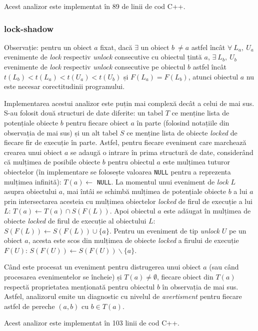 Acest analizor este implementat în 89 de linii de cod C++.

\subsubsection{lock-shadow}

Observație: pentru un obiect $a$ fixat, dacă $\exists$ un
obiect $b\ \neq a$ astfel încât $\forall\ L_a,\ U_a$ evenimente de
\textit{lock} respectiv \textit{unlock} consecutive cu obiectul țintă
$a$, $\exists\ L_b,\ U_b$ evenimente de \textit{lock} respectiv
\textit{unlock} consecutive pe obiectul $b$ astfel încât 
$t(L_b) < t(L_a) < t(U_a) < t(U_b)$ și $F(L_a) = F(L_b)$, atunci
obiectul $a$ nu este necesar corectitudinii programului.

Implementarea acestui analizor este puțin mai complexă decât a celui de
mai sus. S-au folosit două structuri de date diferite: un tabel $T$ ce 
menține lista de potențiale obiecte $b$ pentru fiecare obiect $a$ în
parte (folosind notațiile din observația de mai sus) și un alt tabel $S$
ce menține lista de obiecte \textit{locked} de fiecare fir de execuție
în parte. Astfel, pentru fiecare eveniment care marchează crearea unui
obiect $a$ se adaugă o intrare în prima structură de date, considerând
că mulțimea de posibile obiecte $b$ pentru obiectul $a$ este mulțimea
tuturor obiectelor (în implementare se folosește valoarea
\lstinline{NULL} pentru a reprezenta mulțimea infinită):
$T(a) \gets $ \lstinline{NULL}. La momentul unui eveniment de
\textit{lock} $L$ asupra obiectului $a$, mai întâi se schimbă mulțimea
de potențiale obiecte $b$ a lui $a$  prin intersectarea acesteia cu
mulțimea obiectelor \textit{locked} de firul de execuție a lui $L$:
$T(a) \gets T(a) \cap S(F(L))$. Apoi obiectul $a$ este adăugat în
mulțimea de obiecte \textit{locked} de firul de execuție al obiectului
$L$: $S(F(L)) \gets S(F(L)) \cup \{a\}$. Pentru un eveniment de tip
\textit{unlock} $U$ pe un obiect $a$, acesta este scos din mulțimea de
obiecte \textit{locked} a firului de execuție $F(U)$:
$S(F(U)) \gets S(F(U)) \backslash \{a\}$.

Când este procesat un eveniment pentru distrugerea unui obiect $a$ (sau
când procesarea evenimentelor se încheie) și $T(a) \neq \emptyset$,
fiecare obiect din $T(a)$ respectă proprietatea menționată pentru
obiectul $b$ în observația de mai sus. Astfel, analizorul emite un
diagnostic cu nivelul de \textit{avertisment} pentru fiecare astfel de
pereche $(a, b)$ cu $b \in T(a)$.

Acest analizor este implementat în 103 linii de cod C++.

